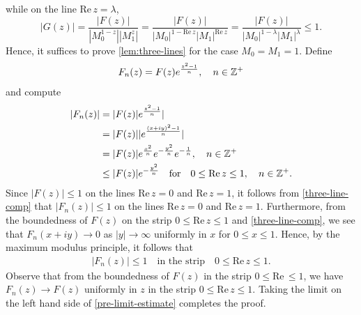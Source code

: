 while on
the line $\text{Re}\, z=\lambda$, $$| G(z) | = \frac{| F(z) |}{| M_0^{1-z} |
|M_1^{z}
|} = \frac{| F(z) |}{| M_0|^{1-\text{Re}\, z}  |M_1|^{\text{Re}\, z}} 
= \frac{| F(z) |}{| M_0|^{1-\lambda}  |M_1|^{\lambda}}  \le 1.$$
%
%
Hence, it suffices to prove \autoref{lem:three-lines} for the case $M_0 = M_1 =
1$. Define 
%
%
\begin{equation*}
\begin{split}
	F_n(z) = F(z) e^{\frac{z^2 -1}{n}}, \quad n \in \mathbb{Z}^+
\end{split}
\end{equation*}
and compute
%
%
\begin{equation}
\label{three-line-comp}
\begin{split}
	| F_n(z) |
	& = | F(z) | e^{\frac{z^{2}-1}{n}} |
	\\
	& = | F(z) | |e^{\frac{(x+iy)^2 -1}{n}}|
	\\
	& = | F(z) |  e^{\frac{x^2}{n}}e^{-\frac{y^2}{n}}e^{-\frac{1}{n}}, \quad n
	\in \mathbb{Z}^+
	\\
	& \le | F(z) |e^{-\frac{y^2}{n}} \quad \text{for} \quad 0 \le \text{Re}\,z \le
	1, \quad n \in \mathbb{Z}^+.
\end{split}
\end{equation}
%
%
Since $| F(z) | \le 1$ on the lines $\text{Re}\, z =0$ and $\text{Re}\, z =1$,
it follows from \eqref{three-line-comp} that $| F_n(z) | \le 1$ on the lines 
$\text{Re}\, z =0$ and $\text{Re}\, z =1$. Furthermore, from the boundedness of
$F(z)$ on the strip $0 \le \text{Re}\, z \le 1$ and \eqref{three-line-comp}, we
see that $F_n(x + iy) \to 0$ as $|y| \to \infty$
uniformly in $x$ for $0 \le x \le 1$. Hence, by the maximum modulus principle,
it follows that 
%
%
%
%
\begin{equation}
\label{pre-limit-estimate}
\begin{split}
	|F_n(z)| \le 1 \quad  \text{in the strip} \quad 0 \le \text{Re}\, z \le 1.
\end{split}
\end{equation}
Observe that from the boundedness of $F(z)$ in the strip $0 \le \text{Re}\, \le
1$, we have \\ $F_n(z) \to F(z)$ uniformly in $z$
in the strip $0 \le \text{Re}\, z\le 1$. Taking the
limit on the left hand side of \eqref{pre-limit-estimate} completes the proof.
\qquad \qedsymbol
